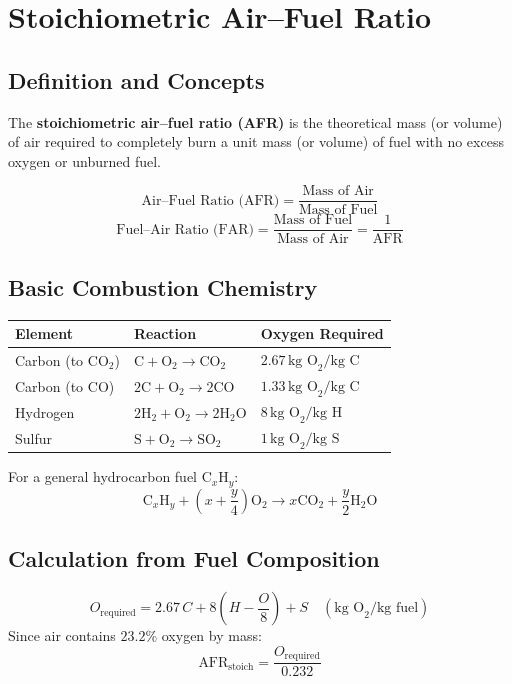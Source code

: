 \documentclass[12pt,a4paper]{article}
\begin{document}
\section{Stoichiometric Air--Fuel Ratio}

\subsection{Definition and Concepts}
The \textbf{stoichiometric air--fuel ratio (AFR)} is the theoretical mass (or volume) of air required to completely burn a unit mass (or volume) of fuel with no excess oxygen or unburned fuel.

\[ \text{Air--Fuel Ratio (AFR)} = \frac{\text{Mass of Air}}{\text{Mass of Fuel}} \]
\[ \text{Fuel--Air Ratio (FAR)} = \frac{\text{Mass of Fuel}}{\text{Mass of Air}} = \frac{1}{\text{AFR}} \]

\subsection{Basic Combustion Chemistry}
\begin{center}
\renewcommand{\arraystretch}{1.4}
\begin{tabular}{|l|l|l|}
\hline
\textbf{Element} & \textbf{Reaction} & \textbf{Oxygen Required} \\
\hline
Carbon (to $\text{CO}_2$) & $\text{C} + \text{O}_2 \rightarrow \text{CO}_2$ & $2.67\,\text{kg O}_2 / \text{kg C}$ \\
Carbon (to $\text{CO}$) & $2\text{C} + \text{O}_2 \rightarrow 2\text{CO}$ & $1.33\,\text{kg O}_2 / \text{kg C}$ \\
Hydrogen & $2\text{H}_2 + \text{O}_2 \rightarrow 2\text{H}_2\text{O}$ & $8\,\text{kg O}_2 / \text{kg H}$ \\
Sulfur & $\text{S} + \text{O}_2 \rightarrow \text{SO}_2$ & $1\,\text{kg O}_2 / \text{kg S}$ \\
\hline
\end{tabular}
\end{center}

For a general hydrocarbon fuel $\text{C}_x\text{H}_y$:
\[ \text{C}_x\text{H}_y + \left(x + \frac{y}{4}\right)\text{O}_2 \rightarrow x\text{CO}_2 + \frac{y}{2}\text{H}_2\text{O} \]

\subsection{Calculation from Fuel Composition}
\[ O_{\mathrm{required}} = 2.67\,C + 8\left(H - \frac{O}{8}\right) + S \quad (\text{kg O}_2 / \text{kg fuel}) \]
Since air contains $23.2\%$ oxygen by mass:
\[ \text{AFR}_{\mathrm{stoich}} = \frac{O_{\mathrm{required}}}{0.232} \]
\end{document}
